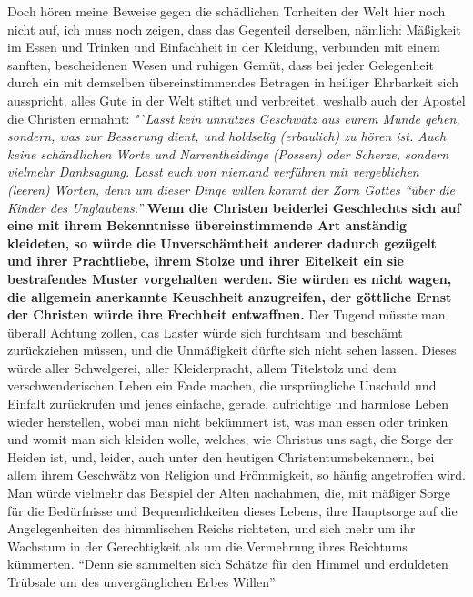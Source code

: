 Doch hören meine Beweise gegen die schädlichen Torheiten der Welt hier noch
nicht auf, ich muss noch zeigen, dass das Gegenteil derselben, nämlich:
Mäßigkeit
im Essen und Trinken und Einfachheit in der Kleidung, verbunden mit einem
sanften, bescheidenen Wesen und ruhigen Gemüt, dass bei jeder Gelegenheit durch
ein mit demselben übereinstimmendes Betragen in heiliger Ehrbarkeit sich
ausspricht, alles Gute in der Welt stiftet und verbreitet, weshalb auch der
Apostel die Christen ermahnt:
\textit{"`Lasst kein unnützes Geschwätz aus eurem Munde
gehen, sondern, was zur Besserung dient, und holdselig (erbaulich) zu hören
ist. Auch keine schändlichen Worte und Narrentheidinge (Possen) oder Scherze,
sondern vielmehr Danksagung. Lasst euch von niemand verführen mit vergeblichen
(leeren) Worten, denn um dieser Dinge willen kommt der Zorn Gottes "`über die
Kinder des Unglaubens."'}
\label{ref:18_08_vorbild_kleidung}\textbf{Wenn die Christen
beiderlei Geschlechts sich auf eine mit ihrem Bekenntnisse übereinstimmende Art
anständig kleideten, so würde die Unverschämtheit anderer dadurch gezügelt und
ihrer Prachtliebe, ihrem Stolze und ihrer Eitelkeit ein sie bestrafendes Muster
vorgehalten werden. Sie würden es nicht wagen, die allgemein anerkannte
Keuschheit anzugreifen, der göttliche Ernst der Christen würde ihre Frechheit
entwaffnen.} Der Tugend müsste man überall Achtung zollen, das Laster würde
sich furchtsam und beschämt zurückziehen müssen, und die Unmäßigkeit dürfte sich
nicht sehen lassen. Dieses würde aller Schwelgerei, aller Kleiderpracht, allem
Titelstolz und dem verschwenderischen Leben ein Ende machen, die ursprüngliche
Unschuld und Einfalt zurückrufen und jenes einfache, gerade, aufrichtige und
harmlose Leben wieder herstellen, wobei man nicht bekümmert ist, was man essen
oder trinken und womit man sich kleiden wolle, welches, wie Christus uns sagt,
die Sorge der Heiden ist, und, leider, auch unter den heutigen
Christentumsbekennern, bei allem ihrem Geschwätz von Religion und
Frömmigkeit, so häufig angetroffen wird. Man würde vielmehr das Beispiel der
Alten nachahmen, die, mit mäßiger Sorge für die Bedürfnisse und Bequemlichkeiten
dieses Lebens, ihre Hauptsorge auf die Angelegenheiten des himmlischen
Reichs
richteten, und sich mehr um ihr Wachstum in der Gerechtigkeit als um die
Vermehrung ihres Reichtums kümmerten. "`Denn sie sammelten sich Schätze für
den Himmel und erduldeten Trübsale um des unvergänglichen Erbes
Willen"'

